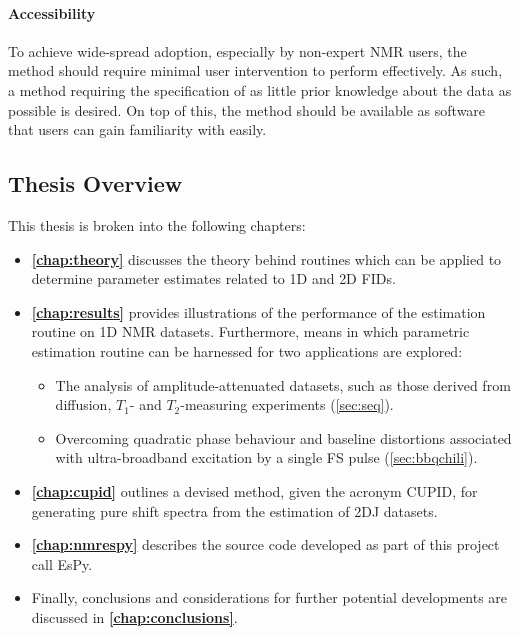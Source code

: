 \paragraph{Accessibility}
To achieve wide-spread adoption, especially by non-expert \ac{NMR} users,
the method should require minimal user intervention to perform effectively. As
such, a method requiring the specification of as little prior knowledge
about the data as possible is desired.
On top of this, the method should be available as software that users can gain
familiarity with easily.

\subsection{Thesis Overview}
This thesis is broken into the following chapters:
\begin{itemize}
    \item \textbf{\cref{chap:theory}} discusses the theory behind routines
        which can be applied to determine parameter estimates related to
        \ac{1D} and \ac{2D} \acp{FID}.
    \item \textbf{\cref{chap:results}} provides illustrations of the
        performance of the estimation routine on \ac{1D} \ac{NMR} datasets.
        Furthermore, means in which parametric estimation routine can be
        harnessed for two applications are explored:
        \begin{itemize}
            \item The analysis of amplitude-attenuated datasets, such as those
                derived from diffusion, $T_1$- and $T_2$-measuring
                experiments (\cref{sec:seq}).
            \item Overcoming quadratic phase behaviour and baseline distortions
                associated with ultra-broadband excitation by a single
                \acl{FS} pulse (\cref{sec:bbqchili}).
        \end{itemize}
    \item \textbf{\cref{chap:cupid}} outlines a devised method, given the acronym
        \acs{CUPID}, for generating pure shift spectra from the estimation of
        \ac{2DJ} datasets.
    \item \textbf{\cref{chap:nmrespy}} describes the source code developed as
        part of this project call \ac{EsPy}.
    \item Finally, conclusions and considerations for further potential
        developments are discussed in \textbf{\cref{chap:conclusions}}.
\end{itemize}

